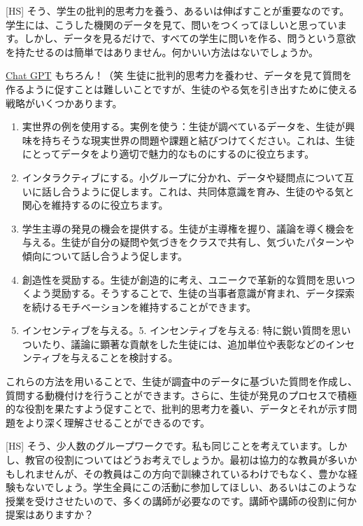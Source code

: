 \documentclass[
]{bxjsbook}
\theoremstyle{definition}
\theoremstyle{definition}
\theoremstyle{definition}
\theoremstyle{definition}
\theoremstyle{remark}
\begin{document}
{[}HS{]} そう、学生の批判的思考力を養う、あるいは伸ばすことが重要なのです。学生には、こうした機関のデータを見て、問いをつくってほしいと思っています。しかし、データを見るだけで、すべての学生に問いを作る、問うという意欲を持たせるのは簡単ではありません。何かいい方法はないでしょうか。

\protect\hyperlink{chatgpt}{Chat GPT} もちろん！（笑 生徒に批判的思考力を養わせ、データを見て質問を作るように促すことは難しいことですが、生徒のやる気を引き出すために使える戦略がいくつかあります。

\begin{enumerate}
\def\labelenumi{\arabic{enumi}.}
\item
  実世界の例を使用する。実例を使う：生徒が調べているデータを、生徒が興味を持ちそうな現実世界の問題や課題と結びつけてください。これは、生徒にとってデータをより適切で魅力的なものにするのに役立ちます。
\item
  インタラクティブにする。小グループに分かれ、データや疑問点について互いに話し合うように促します。これは、共同体意識を育み、生徒のやる気と関心を維持するのに役立ちます。
\item
  学生主導の発見の機会を提供する。生徒が主導権を握り、議論を導く機会を与える。生徒が自分の疑問や気づきをクラスで共有し、気づいたパターンや傾向について話し合うよう促します。
\item
  創造性を奨励する。生徒が創造的に考え、ユニークで革新的な質問を思いつくよう奨励する。そうすることで、生徒の当事者意識が育まれ、データ探索を続けるモチベーションを維持することができます。
\item
  インセンティブを与える。5. インセンティブを与える: 特に鋭い質問を思いついたり、議論に顕著な貢献をした生徒には、追加単位や表彰などのインセンティブを与えることを検討する。
\end{enumerate}

これらの方法を用いることで、生徒が調査中のデータに基づいた質問を作成し、質問する動機付けを行うことができます。さらに、生徒が発見のプロセスで積極的な役割を果たすよう促すことで、批判的思考力を養い、データとそれが示す問題をより深く理解させることができるのです。

{[}HS{]} そう、少人数のグループワークです。私も同じことを考えています。しかし、教官の役割についてはどうお考えでしょうか。最初は協力的な教員が多いかもしれませんが、その教員はこの方向で訓練されているわけでもなく、豊かな経験もないでしょう。学生全員にこの活動に参加してほしい、あるいはこのような授業を受けさせたいので、多くの講師が必要なのです。講師や講師の役割に何か提案はありますか？
\end{document}
